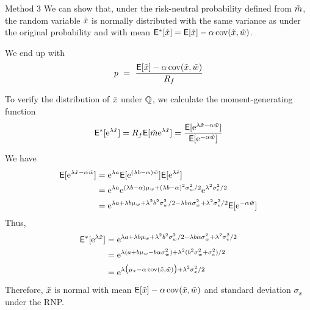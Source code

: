 \documentclass[xcolor=dvipsnames,10pt]{beamer}
\begin{document}
\begin{frame}{Method 3}
We can show that, under the risk-neutral probability defined from $\tilde{m}$, the random variable $\tilde{x}$ is normally distributed with the same variance as under the original probability and with mean $\mathsf{E}^*[\tilde{x}] = \mathsf{E}[\tilde{x}] - \alpha \operatorname{cov}(\tilde{x},\tilde{w})$.

We end up with
$$p \ = \ \frac{\mathsf{E}[\tilde{x}] - \alpha \operatorname{cov}(\tilde{x},\tilde{w})}{R_f}$$

To verify the distribution of $\tilde{x}$ under $\mathbb{Q}$, we calculate the moment-generating function
$$\mathsf{E}^*[\mathrm{e}^{\lambda \tilde{x}}] = R_f \mathsf{E}[\tilde{m} \mathrm{e}^{\lambda \tilde{x}}] = \frac{\mathsf{E}[\mathrm{e}^{\lambda \tilde{x} -\alpha \tilde{w}}]}{\mathsf{E}[\mathrm{e}^{-\alpha \tilde{w}}]}$$
\end{frame}

\begin{frame}[plain]
    We have
 \begin{align*}
     \mathsf{E}[\mathrm{e}^{\lambda \tilde{x} -\alpha \tilde{w}}] &= \mathrm{e}^{\lambda a}\mathsf{E}[\mathrm{e}^{(\lambda b-\alpha)\tilde{w}}]\mathsf{E}[\mathrm{e}^{\lambda \tilde{e}}]\\
     &= \mathrm{e}^{\lambda a}\mathrm{e}^{(\lambda b-\alpha)\mu_w + (\lambda b-\alpha)^2\sigma_w^2/2}\mathrm{e}^{\lambda^2\sigma^2_e/2}\\
     &= \mathrm{e}^{\lambda a+\lambda b\mu_w +\lambda^2b^2\sigma_w^2/2 - \lambda b \alpha \sigma_w^2 + \lambda^2\sigma_e^2/2}\mathsf{E}[\mathrm{e}^{-\alpha \tilde{w}}]
 \end{align*} 
 Thus,
 \begin{align*}
     \mathsf{E}^*[\mathrm{e}^{\lambda \tilde{x}}] & = \mathrm{e}^{\lambda a+\lambda b\mu_w +\lambda^2b^2\sigma_w^2/2 - \lambda b \alpha \sigma_w^2 + \lambda^2\sigma_e^2/2}\\
     &= \mathrm{e}^{\lambda (a + b \mu_w - b \alpha \sigma_w^2) + \lambda^2(b^2\sigma_w^2 + \sigma_e^2)/2}\\
     &= \mathrm{e}^{\lambda \big(\mu_x - \alpha \operatorname{cov}(\tilde{x},\tilde{w})\big) + \lambda^2\sigma_x^2/2}
     \end{align*}
Therefore, $\tilde{x}$ is normal with mean $\mathsf{E}[\tilde{x}] - \alpha \operatorname{cov}(\tilde{x},\tilde{w})$ and standard deviation $\sigma_x$ under the RNP.
\end{frame}
\end{document}
